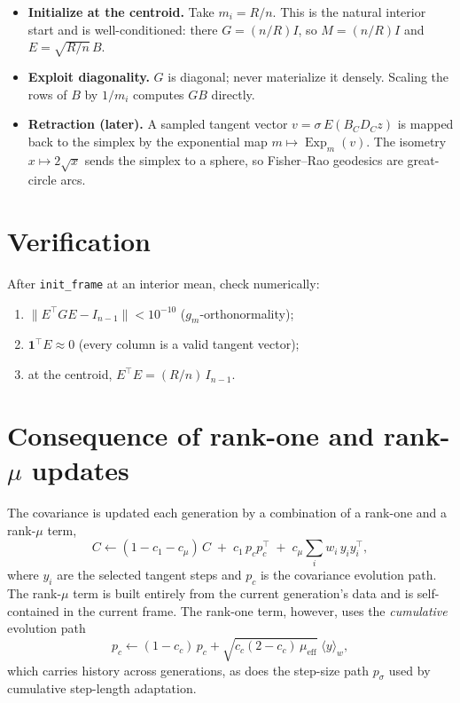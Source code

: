\documentclass[11pt]{article}
\newcommand{\one}{\mathbf{1}}
\newcommand{\geff}{\mu_{\mathrm{eff}}}
\DeclareMathOperator{\Exp}{Exp}
\begin{document}
\begin{itemize}[leftmargin=1.4em]
  \item \textbf{Initialize at the centroid.} Take $m_i = R/n$. This is the
        natural interior start and is well-conditioned: there
        $G = (n/R) I$, so $M = (n/R) I$ and $E = \sqrt{R/n}\, B$.
  \item \textbf{Exploit diagonality.} $G$ is diagonal; never materialize it
        densely. Scaling the rows of $B$ by $1/m_i$ computes $GB$ directly.
  \item \textbf{Retraction (later).} A sampled tangent vector
        $v = \sigma\, E (B_C D_C z)$ is mapped back to the simplex by the
        exponential map $m \mapsto \Exp_m(v)$. The isometry
        $x \mapsto 2\sqrt{x}$ sends the simplex to a sphere, so Fisher--Rao
        geodesics are great-circle arcs.
\end{itemize}

\section{Verification}

After \texttt{init\_frame} at an interior mean, check numerically:
\begin{enumerate}[label=(\arabic*), leftmargin=2em]
  \item $\|E^\top G E - I_{n-1}\| < 10^{-10}$ \quad ($g_m$-orthonormality);
  \item $\one^\top E \approx 0$ \quad (every column is a valid tangent vector);
  \item at the centroid, $E^\top E = (R/n)\, I_{n-1}$.
\end{enumerate}

\section{Consequence of rank-one and rank-$\mu$ updates}

The covariance is updated each generation by a combination of a rank-one and a
rank-$\mu$ term,
\begin{equation}
  C \leftarrow (1 - c_1 - c_\mu)\, C
    \;+\; c_1\, p_c p_c^\top
    \;+\; c_\mu \sum_{i} w_i\, y_i y_i^\top,
  \label{eq:cupdate}
\end{equation}
where $y_i$ are the selected tangent steps and $p_c$ is the covariance
evolution path. The rank-$\mu$ term is built entirely from the current
generation's data and is self-contained in the current frame. The rank-one
term, however, uses the \emph{cumulative} evolution path
\begin{equation}
  p_c \leftarrow (1 - c_c)\, p_c
    + \sqrt{c_c (2 - c_c)\, \geff}\;\langle y \rangle_w,
  \label{eq:pc}
\end{equation}
which carries history across generations, as does the step-size path $p_\sigma$
used by cumulative step-length adaptation.
\end{document}
